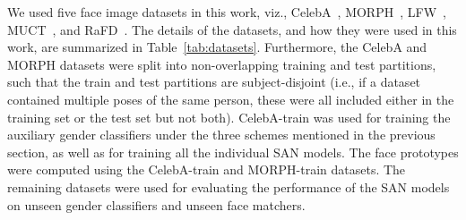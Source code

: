 \documentclass[10pt,twocolumn,letterpaper]{article}
\begin{document}
We used five face image datasets in this work, viz., CelebA~\cite{liu_deep_2015_long}, MORPH~\cite{ricanek_morph_2006}, LFW~\cite{huang_labeled_2007_long}, MUCT~\cite{milborrow_muct_2010}, and RaFD~\cite{langner_presentation_2010}. The details of the datasets, and how they were used in this work, are summarized in Table~\ref{tab:datasets}. Furthermore, the CelebA and MORPH datasets were split into non-overlapping training and test partitions, such that the train and test partitions are subject-disjoint (i.e., if a dataset contained multiple poses of the same person, these were all included either in the training set or the test set but not both). CelebA-train was used for training the auxiliary gender classifiers under the three schemes mentioned in the previous section, as well as for training all the individual SAN models. The face prototypes were computed using the CelebA-train and MORPH-train datasets. The remaining datasets were used for evaluating the performance of the SAN models on unseen gender classifiers and unseen face matchers.
\end{document}
